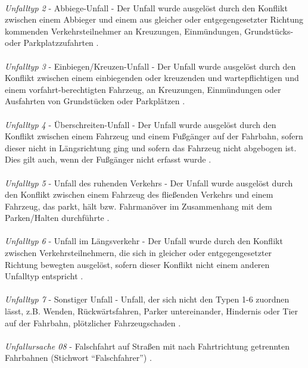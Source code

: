 \\
\textit{Unfalltyp 2} - Abbiege-Unfall - Der Unfall wurde ausgelöst durch den Konflikt zwischen einem Abbieger und einem aus gleicher oder entgegengesetzter Richtung kommenden Verkehrsteilnehmer an Kreuzungen, Einmündungen, Grundstücks- oder Parkplatzzufahrten \parencite{PolizeiprasidiumOberbeyernSud.2016}.\\
\\
\textit{Unfalltyp 3} - Einbiegen/Kreuzen-Unfall - Der Unfall wurde ausgelöst durch den Konflikt zwischen einem einbiegenden oder kreuzenden und wartepflichtigen und einem vorfahrt-berechtigten Fahrzeug, an Kreuzungen, Einmündungen oder Ausfahrten von Grundstücken oder Parkplätzen \parencite{PolizeiprasidiumOberbeyernSud.2016}.\\
\\
\textit{Unfalltyp 4} - Überschreiten-Unfall - Der Unfall wurde ausgelöst durch den Konflikt zwischen einem Fahrzeug und einem Fußgänger auf der Fahrbahn, sofern dieser nicht in Längsrichtung ging und sofern das Fahrzeug nicht abgebogen ist. Dies gilt auch, wenn der Fußgänger nicht erfasst wurde \parencite{PolizeiprasidiumOberbeyernSud.2016}.\\
\\
\textit{Unfalltyp 5} - Unfall des ruhenden Verkehrs - Der Unfall wurde ausgelöst durch den Konflikt zwischen einem Fahrzeug des fließenden Verkehrs und einem Fahrzeug, das parkt, hält bzw. Fahrmanöver im Zusammenhang mit dem Parken/Halten durchführte \parencite{PolizeiprasidiumOberbeyernSud.2016}.\\
\\
\textit{Unfalltyp 6} - Unfall im Längsverkehr - Der Unfall wurde durch den Konflikt zwischen Verkehrsteilnehmern, die sich in gleicher oder entgegengesetzter Richtung bewegten ausgelöst, sofern dieser Konflikt nicht einem anderen Unfalltyp entspricht \parencite{PolizeiprasidiumOberbeyernSud.2016}.\\
\\
\textit{Unfalltyp 7} - Sonstiger Unfall - Unfall, der sich nicht den Typen 1-6 zuordnen lässt, z.B. Wenden, Rückwärtsfahren, Parker untereinander, Hindernis oder Tier auf der Fahrbahn, plötzlicher Fahrzeugschaden \parencite{PolizeiprasidiumOberbeyernSud.2016}.\\
\\
\textit{Unfallursache 08} - Falschfahrt auf Straßen mit nach Fahrtrichtung getrennten Fahrbahnen (Stichwort \enquote{Falschfahrer}) \parencite{PolizeiprasidiumOberbeyernSud.2016}.\\
